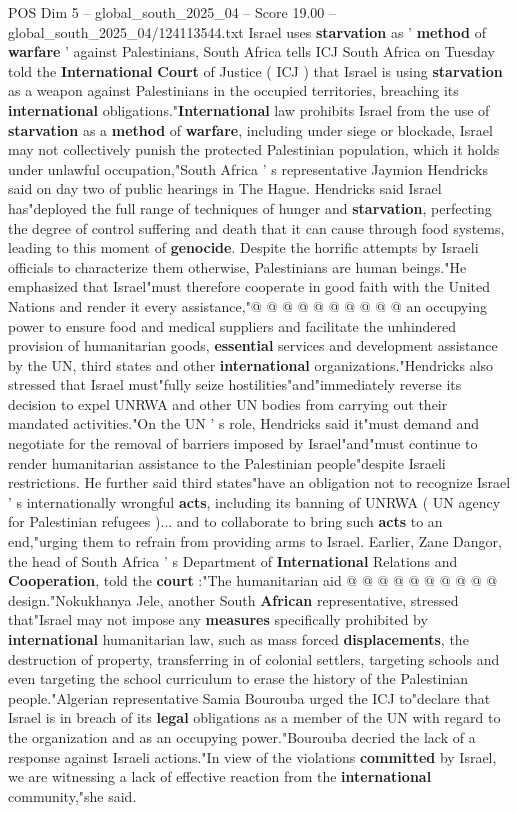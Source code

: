 \begin{textsample}{POS Dim 5 – global\_south\_2025\_04 – Score 19.00 – global\_south\_2025\_04/124113544.txt}  \label{ex:f5_pos_081}
Israel uses \textbf{starvation} as ' \textbf{method} of \textbf{warfare} ' against Palestinians, South Africa tells ICJ South Africa on Tuesday told the \textbf{International} \textbf{Court} of Justice ( ICJ ) that Israel is using \textbf{starvation} as a weapon against Palestinians in the occupied territories, breaching its \textbf{international} obligations."\textbf{International} law prohibits Israel from the use of \textbf{starvation} as a \textbf{method} of \textbf{warfare}, including under siege or blockade, Israel may not collectively punish the protected Palestinian population, which it holds under unlawful occupation,"South Africa ' s representative Jaymion Hendricks said on day two of public hearings in The Hague.
Hendricks said Israel has"deployed the full range of techniques of hunger and \textbf{starvation}, perfecting the degree of control suffering and death that it can cause through food systems, leading to this moment of \textbf{genocide}.
Despite the horrific attempts by Israeli officials to characterize them otherwise, Palestinians are human beings."He emphasized that Israel"must therefore cooperate in good faith with the United Nations and render it every assistance,"@ @ @ @ @ @ @ @ @ @ an occupying power to ensure food and medical suppliers and facilitate the unhindered provision of humanitarian goods, \textbf{essential} services and development assistance by the UN, third states and other \textbf{international} organizations."Hendricks also stressed that Israel must"fully seize hostilities"and"immediately reverse its decision to expel UNRWA and other UN bodies from carrying out their mandated activities."On the UN ' s role, Hendricks said it"must demand and negotiate for the removal of barriers imposed by Israel"and"must continue to render humanitarian assistance to the Palestinian people"despite Israeli restrictions.
He further said third states"have an obligation not to recognize Israel ' s internationally wrongful \textbf{acts}, including its banning of UNRWA ( UN agency for Palestinian refugees )... and to collaborate to bring such \textbf{acts} to an end,"urging them to refrain from providing arms to Israel.
Earlier, Zane Dangor, the head of South Africa ' s Department of \textbf{International} Relations and \textbf{Cooperation}, told the \textbf{court} :"The humanitarian aid @ @ @ @ @ @ @ @ @ @ design."Nokukhanya Jele, another South \textbf{African} representative, stressed that"Israel may not impose any \textbf{measures} specifically prohibited by \textbf{international} humanitarian law, such as mass forced \textbf{displacements}, the destruction of property, transferring in of colonial settlers, targeting schools and even targeting the school curriculum to erase the history of the Palestinian people."Algerian representative Samia Bourouba urged the ICJ to"declare that Israel is in breach of its \textbf{legal} obligations as a member of the UN with regard to the organization and as an occupying power."Bourouba decried the lack of a response against Israeli actions."In view of the violations \textbf{committed} by Israel, we are witnessing a lack of effective reaction from the \textbf{international} community,"she said.

\end{textsample}

